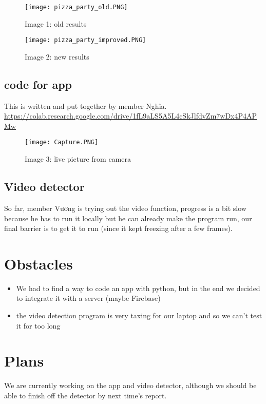 \documentclass{article}
\begin{document}
\begin{figure}
\centerline{\texttt{[image: pizza\_party\_old.PNG]}}
    \label{fig:new pizza party}
    \caption*{Image 1: old results}
\centerline{\texttt{[image: pizza\_party\_improved.PNG]}}
	\label{fig:old pizza party}
    \caption*{Image 2: new results}
\end{figure}
\subsection{code for app}
This is written and put together by member Nghĩa.
\url{https://colab.research.google.com/drive/1fL9aLS5A5L4cSkJlfdvZm7wDx4P4APMw}
\begin{figure}[h]
\centerline{\texttt{[image: Capture.PNG]}}
	\label{fig:live cam}
	\caption*{Image 3: live picture from camera}
\end{figure}
\subsection{Video detector}
So far, member Vương is trying out the video function, progress is a bit slow because he has to run it locally but he can already make the program run, our final barrier is to get it to run (since it kept freezing after a few frames).

\section{Obstacles}
\begin{itemize}
	\item We had to find a way to code an app with python, but in the end we decided to integrate it with a server (maybe Firebase)
	\item the video detection program is very taxing for our laptop and so we can't test it for too long
\end{itemize}
\section{Plans}
We are currently working on the app and video detector, although we should be able to finish off the detector by next time's report.
\end{document}
